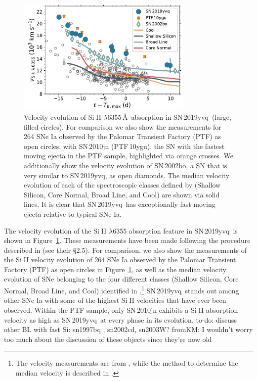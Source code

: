 \documentclass[twocolumn]{aastex63}
\def\ion#1#2{#1$\;${\footnotesize\rm{#2}}\relax}
\newcommand{\fromkate}[1]{{\color{brown} fromKM: {#1}}}
\newcommand{\todo}[1]{{\color{magenta} to-do: {#1}}}
\newcommand{\sn}{SN\,2019yvq}
\begin{document}
\begin{figure}
    \centering
    \includegraphics[width=3.35in]{./figures/vel_evolution.pdf}
    \caption{Velocity evolution of \ion{Si}{II} $\lambda$6355\,\AA\ absorption
    in \sn\ (large, filled circles). For comparison we also show the
    measurements for 264 SNe Ia observed by the Palomar Transient Factory
    (PTF) as open circles, with SN\,2010jn (PTF\,10ygu), the SN with the
    fastest moving ejecta in the PTF sample, highlighted via orange crosses.
    We additionally show the velocity evolution of SN\,2002bo, a SN that is
    very similar to \sn, as open diamonds. The median velocity evolution of
    each of the spectroscopic classes defined by \citet{Branch06} (Shallow
    Silicon, Core Normal, Broad Line, and Cool) are shown via solid lines. It
    is clear that \sn\ has exceptionally fast moving ejecta relative to
    typical SNe Ia.}
    \label{fig:vel_evo}
\end{figure}

The velocity evolution of the \ion{Si}{II} $\lambda$6355 absorption feature
in \sn\ is shown in Figure~\ref{fig:vel_evo}. These measurements have been
made following the procedure described in \citet{Maguire14} (see their
\S2.5). For comparison, we also show the \citet{Maguire14} measurements of
the \ion{Si}{II} velocity evolution of 264 SNe Ia observed by the Palomar
Transient Factory (PTF) as open circles in Figure~\ref{fig:vel_evo}, as well
as the median velocity evolution of SNe belonging to the four different
classes (Shallow Silicon, Core Normal, Broad Line, and Cool) identified in
\citet{Branch06}.\footnote{The velocity measurements are from
\citet{Blondin12}, while the method to determine the median velocity is
described in \citet{Miller18}.} \sn\ stands out among other SNe Ia with
some of the highest \ion{Si}{II} velocities that have ever been observed.
Within the PTF sample, only SN\,2010jn exhibits a \ion{Si}{II} absorption
velocity as high as \sn\ at every phase in its evolution. \todo{discuss other
BL with fast Si: sn1997bq , sn2002cd, sn2003W?} \fromkate{I wouldn't worry too much about the discussion of these objects since they're now old}
\end{document}
